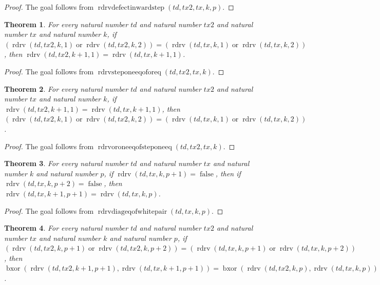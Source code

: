 \documentclass[11pt]{article}
\newtheorem{theorem}{Theorem}[section]
\theoremstyle{definition}
\begin{document}
\begin{proof}
The goal follows from \(\operatorname{rdrvdefectinwardstep}(td, tx2, tx, k, p)\).
\end{proof}
\begin{theorem}
\label{ll:paper:rdrv-step-one-eq-of-or-eq}
For every natural number \(td\) and natural number \(tx2\) and natural number \(tx\) and natural number \(k\), if \((\operatorname{rdrv}(td, tx2, k, 1) \operatorname{or} \operatorname{rdrv}(td, tx2, k, 2)) = (\operatorname{rdrv}(td, tx, k, 1) \operatorname{or} \operatorname{rdrv}(td, tx, k, 2))\), then \(\operatorname{rdrv}(td, tx2, k + 1, 1) = \operatorname{rdrv}(td, tx, k + 1, 1)\).
\end{theorem}
\begin{proof}
The goal follows from \(\operatorname{rdrvsteponeeqoforeq}(td, tx2, tx, k)\).
\end{proof}
\begin{theorem}
\label{ll:paper:rdrv-or-one-eq-of-step-one-eq}
For every natural number \(td\) and natural number \(tx2\) and natural number \(tx\) and natural number \(k\), if \(\operatorname{rdrv}(td, tx2, k + 1, 1) = \operatorname{rdrv}(td, tx, k + 1, 1)\), then \((\operatorname{rdrv}(td, tx2, k, 1) \operatorname{or} \operatorname{rdrv}(td, tx2, k, 2)) = (\operatorname{rdrv}(td, tx, k, 1) \operatorname{or} \operatorname{rdrv}(td, tx, k, 2))\).
\end{theorem}
\begin{proof}
The goal follows from \(\operatorname{rdrvoroneeqofsteponeeq}(td, tx2, tx, k)\).
\end{proof}
\begin{theorem}
\label{ll:paper:rdrv-diag-eq-of-white-pair}
For every natural number \(td\) and natural number \(tx\) and natural number \(k\) and natural number \(p\), if \(\operatorname{rdrv}(td, tx, k, p + 1) = \operatorname{false}\), then if \(\operatorname{rdrv}(td, tx, k, p + 2) = \operatorname{false}\), then \(\operatorname{rdrv}(td, tx, k + 1, p + 1) = \operatorname{rdrv}(td, tx, k, p)\).
\end{theorem}
\begin{proof}
The goal follows from \(\operatorname{rdrvdiageqofwhitepair}(td, tx, k, p)\).
\end{proof}
\begin{theorem}
\label{ll:paper:rdrv-defect-diag-eq-of-or-eq}
For every natural number \(td\) and natural number \(tx2\) and natural number \(tx\) and natural number \(k\) and natural number \(p\), if \((\operatorname{rdrv}(td, tx2, k, p + 1) \operatorname{or} \operatorname{rdrv}(td, tx2, k, p + 2)) = (\operatorname{rdrv}(td, tx, k, p + 1) \operatorname{or} \operatorname{rdrv}(td, tx, k, p + 2))\), then \(\operatorname{bxor}(\operatorname{rdrv}(td, tx2, k + 1, p + 1), \operatorname{rdrv}(td, tx, k + 1, p + 1)) = \operatorname{bxor}(\operatorname{rdrv}(td, tx2, k, p), \operatorname{rdrv}(td, tx, k, p))\).
\end{theorem}
\end{document}
